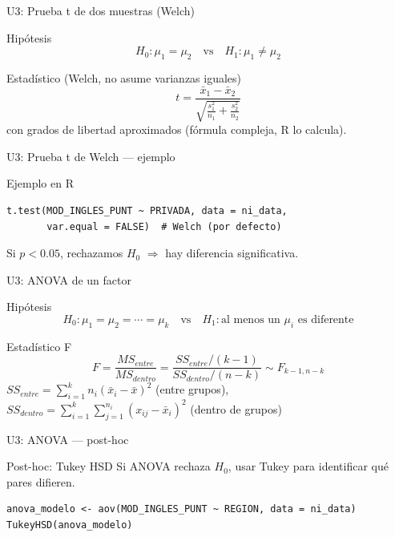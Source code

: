 \documentclass[aspectratio=169, 11pt]{beamer}
\begin{document}
\begin{frame}{U3: Prueba t de dos muestras (Welch)}
\begin{block}{Hipótesis}
$$H_0: \mu_1 = \mu_2 \quad \text{vs} \quad H_1: \mu_1 \neq \mu_2$$
\end{block}

\begin{block}{Estadístico (Welch, no asume varianzas iguales)}
$$t = \frac{\bar{x}_1 - \bar{x}_2}{\sqrt{\frac{s_1^2}{n_1} + \frac{s_2^2}{n_2}}}$$
con grados de libertad aproximados (fórmula compleja, R lo calcula).
\end{block}
\end{frame}

\begin{frame}[fragile]{U3: Prueba t de Welch --- ejemplo}
\begin{exampleblock}{Ejemplo en R}
\begin{lstlisting}
t.test(MOD_INGLES_PUNT ~ PRIVADA, data = ni_data,
       var.equal = FALSE)  # Welch (por defecto)
\end{lstlisting}
Si $p < 0.05$, rechazamos $H_0$ $\Rightarrow$ hay diferencia significativa.
\end{exampleblock}
\end{frame}

\begin{frame}{U3: ANOVA de un factor}
\begin{block}{Hipótesis}
$$H_0: \mu_1 = \mu_2 = \cdots = \mu_k \quad \text{vs} \quad H_1: \text{al menos un } \mu_i \text{ es diferente}$$
\end{block}

\begin{block}{Estadístico F}
$$F = \frac{MS_{entre}}{MS_{dentro}} = \frac{SS_{entre}/(k-1)}{SS_{dentro}/(n-k)} \sim F_{k-1, n-k}$$
\small
$SS_{entre} = \sum_{i=1}^{k} n_i (\bar{x}_i - \bar{x})^2$ (entre grupos), \quad
$SS_{dentro} = \sum_{i=1}^{k} \sum_{j=1}^{n_i} (x_{ij} - \bar{x}_i)^2$ (dentro de grupos)
\end{block}
\end{frame}

\begin{frame}[fragile]{U3: ANOVA --- post-hoc}
\begin{alertblock}{Post-hoc: Tukey HSD}
Si ANOVA rechaza $H_0$, usar Tukey para identificar qué pares difieren.
\begin{lstlisting}
anova_modelo <- aov(MOD_INGLES_PUNT ~ REGION, data = ni_data)
TukeyHSD(anova_modelo)
\end{lstlisting}
\end{alertblock}
\end{frame}
\end{document}
